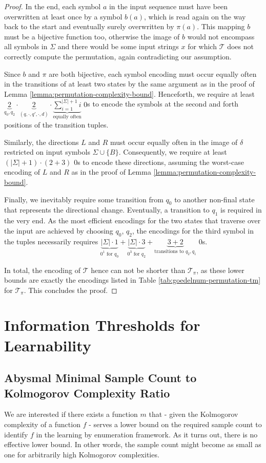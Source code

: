 \begin{proof}
	In the end, each symbol $a$ in the input sequence must have been overwritten at least once by a symbol $b(a)$, which is read again on the way back to the start and eventually surely overwritten by $\pi(a)$.
	This mapping $b$ must be a bijective function too, otherwise the image of $b$ would not encompass all symbols in $\Sigma$ and there would be some input strings $x$ for which $\mathcal{T}$ does not correctly compute the permutation, again contradicting our assumption.
	
	Since $b$ and $\pi$ are both bijective, each symbol encoding must occur equally often in the transitions of at least two states by the same argument as in the proof of Lemma \ref{lemma:permutation-complexity-bound}.
	Henceforth, we require at least $\underbrace{2}_{q_0,q_2}\cdot\underbrace{2}_{(q,\cdot,q',\cdot,d)}\cdot\underbrace{\sum_{i=1}^{|\Sigma|+1}i}_{\text{equally often}}$ $0$s to encode the symbols at the second and forth positions of the transition tuples.
	
	Similarly, the directions $L$ and $R$ must occur equally often in the image of $\delta$ restricted on input symbols $\Sigma\cup\{B\}$.
	Consequently, we require at least $(|\Sigma|+1)\cdot(2+3)$ $0$s to encode these directions, assuming the worst-case encoding of $L$ and $R$ as in the proof of Lemma \ref{lemma:permutation-complexity-bound}.
	
	Finally, we inevitably require some transition from $q_0$ to another non-final state that represents the directional change.
	Eventually, a transition to $q_1$ is required in the very end.
	As the most efficient encodings for the two states that traverse over the input are achieved by choosing $q_0$, $q_2$, the encodings for the third symbol in the tuples necessarily requires $\underbrace{|\Sigma|\cdot 1}_{0^1 \text{ for } q_0} + \underbrace{|\Sigma|\cdot 3}_{0^3 \text{ for } q_2} + \underbrace{3 + 2}_{\text{transitions to }q_2,q_1}$ $0$s.
	
	In total, the encoding of $\mathcal{T}$ hence can not be shorter than $\mathcal{T}_\pi$, as these lower bounds are exactly the encodings listed in Table \ref{tab:goedelnum-permutation-tm} for $\mathcal{T}_\pi$.
	This concludes the proof.
\end{proof}
\section{Information Thresholds for Learnability}
\subsection{Abysmal Minimal Sample Count to Kolmogorov Complexity Ratio}
We are interested if there exists a function $m$ that - given the Kolmogorov complexity of a function $f$ - serves a lower bound on the required sample count to identify $f$ in the learning by enumeration framework. As it turns out, there is no effective lower bound. In other words, the sample count might become as small as one for arbitrarily high Kolmogorov complexities.

